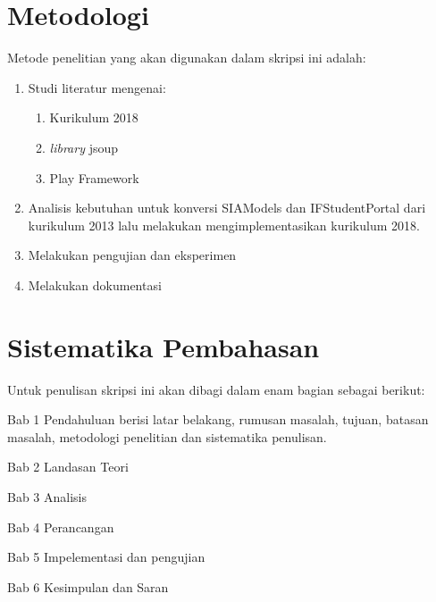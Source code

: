 \section{Metodologi}
\label{sec:metlit}
Metode penelitian yang akan digunakan dalam skripsi ini adalah:
\begin{enumerate}
	\item Studi literatur mengenai:
	\begin{enumerate}
		\item Kurikulum 2018
		\item \textit{library} jsoup
		\item Play Framework
	\end{enumerate}
	\item Analisis kebutuhan untuk konversi SIAModels dan IFStudentPortal dari kurikulum 2013 lalu melakukan mengimplementasikan kurikulum 2018.
	\item Melakukan pengujian dan eksperimen
	\item Melakukan dokumentasi
	
\end{enumerate}


\section{Sistematika Pembahasan}
\label{sec:sispem}
Untuk penulisan skripsi ini akan dibagi dalam enam bagian sebagai berikut:

Bab 1 Pendahuluan berisi latar belakang, rumusan masalah, tujuan, batasan masalah, metodologi penelitian dan sistematika penulisan.

Bab 2 Landasan Teori

Bab 3 Analisis

Bab 4 Perancangan

Bab 5 Impelementasi dan pengujian

Bab 6 Kesimpulan dan Saran 

